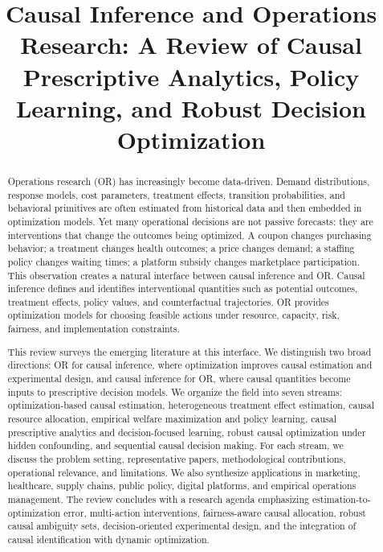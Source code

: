 \documentclass[11pt]{article}
\title{\textbf{Causal Inference and Operations Research: A Review of Causal Prescriptive Analytics, Policy Learning, and Robust Decision Optimization}}
\author{}
\date{}
\begin{document}
\maketitle

\begin{abstract}
Operations research (OR) has increasingly become data-driven. Demand distributions, response models, cost parameters, treatment effects, transition probabilities, and behavioral primitives are often estimated from historical data and then embedded in optimization models. Yet many operational decisions are not passive forecasts: they are interventions that change the outcomes being optimized. A coupon changes purchasing behavior; a treatment changes health outcomes; a price changes demand; a staffing policy changes waiting times; a platform subsidy changes marketplace participation. This observation creates a natural interface between causal inference and OR. Causal inference defines and identifies interventional quantities such as potential outcomes, treatment effects, policy values, and counterfactual trajectories. OR provides optimization models for choosing feasible actions under resource, capacity, risk, fairness, and implementation constraints.

This review surveys the emerging literature at this interface. We distinguish two broad directions: OR for causal inference, where optimization improves causal estimation and experimental design, and causal inference for OR, where causal quantities become inputs to prescriptive decision models. We organize the field into seven streams: optimization-based causal estimation, heterogeneous treatment effect estimation, causal resource allocation, empirical welfare maximization and policy learning, causal prescriptive analytics and decision-focused learning, robust causal optimization under hidden confounding, and sequential causal decision making. For each stream, we discuss the problem setting, representative papers, methodological contributions, operational relevance, and limitations. We also synthesize applications in marketing, healthcare, supply chains, public policy, digital platforms, and empirical operations management. The review concludes with a research agenda emphasizing estimation-to-optimization error, multi-action interventions, fairness-aware causal allocation, robust causal ambiguity sets, decision-oriented experimental design, and the integration of causal identification with dynamic optimization.
\end{abstract}
\end{document}
